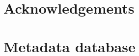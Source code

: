 \documentclass[twocolumn]{bmcart}
\begin{document}


\begin{backmatter}

\section*{Acknowledgements}


\lipsum[1]


%




\appendix
\onecolumn

\section{Metadata database}
\label{sect:meta-database}


\end{backmatter}
\end{document}
